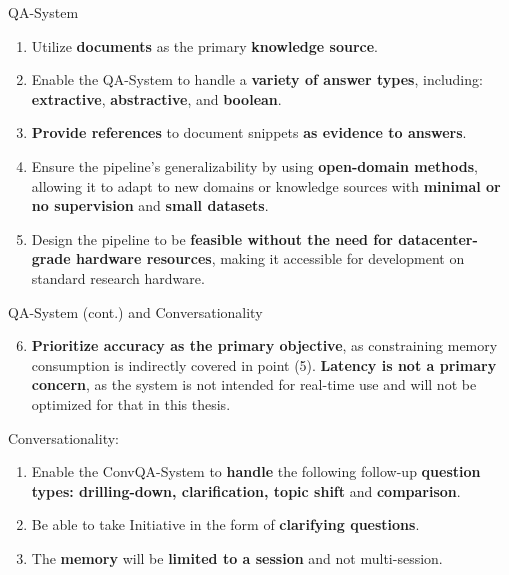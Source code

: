 \documentclass{beamer}
\begin{document}
\begin{frame}{QA-System}
  \begin{enumerate}
    \item Utilize \textbf{documents} as the primary \textbf{knowledge source}.
    \item Enable the QA-System to handle a \textbf{variety of answer types}, including: \textbf{extractive}, \textbf{abstractive}, and \textbf{boolean}.
    \item \textbf{Provide references} to document snippets \textbf{as evidence to answers}.
    \item Ensure the pipeline's generalizability by using \textbf{open-domain methods}, allowing it to adapt to new domains or knowledge sources with \textbf{minimal or no supervision} and \textbf{small datasets}.
    \item Design the pipeline to be \textbf{feasible without the need for datacenter-grade hardware resources}, making it accessible for development on standard research hardware.
  \end{enumerate}
\end{frame}
  
\begin{frame}{QA-System (cont.) and Conversationality}
  \begin{enumerate}
    \setcounter{enumi}{5}
    \item \textbf{Prioritize accuracy as the primary objective}, as constraining memory consumption is indirectly covered in point (5). \textbf{Latency is not a primary concern}, as the system is not intended for real-time use and will not be optimized for that in this thesis.
  \end{enumerate}
  
  Conversationality:
  \begin{enumerate}
    \item Enable the ConvQA-System to \textbf{handle} the following follow-up \textbf{question types: drilling-down, clarification, topic shift} and \textbf{comparison}.
    \item Be able to take Initiative in the form of \textbf{clarifying questions}.
    \item The \textbf{memory} will be \textbf{limited to a session} and not multi-session.
  \end{enumerate}
\end{frame}
\end{document}
